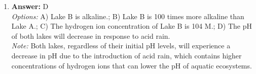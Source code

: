 \documentclass[12pt]{article}
\begin{document}
\begin{enumerate}[label=\arabic*.]
\\ \textit{Note:} Simple diffusion relies on the movement of substances from areas of higher concentration to lower concentration, which is insufficient for the uptake of dissolved minerals by water plants that often require transport against their concentration gradients for proper nutrition and growth.
\item \textbf{Answer:} D
\\ \textit{Options:} A) Lake B is alkaline.; B) Lake B is 100 times more alkaline than Lake A.; C) The hydrogen ion concentration of Lake B is 104 M.; D) The pH of both lakes will decrease in response to acid rain.
\\ \textit{Note:} Both lakes, regardless of their initial pH levels, will experience a decrease in pH due to the introduction of acid rain, which contains higher concentrations of hydrogen ions that can lower the pH of aquatic ecosystems.
\end{enumerate}
\end{document}

